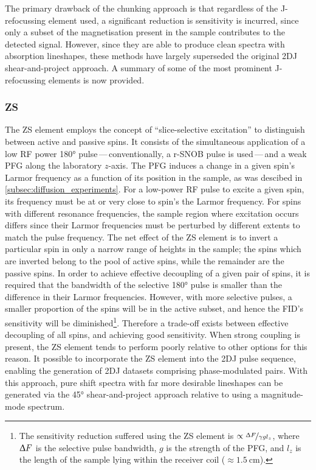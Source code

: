 The primary drawback of the chunking approach is that regardless of the
J-refocussing element used, a significant reduction is sensitivity is incurred,
since only a subset of the magnetisation present in the sample contributes to
the detected signal. However, since they are able to produce clean
spectra with absorption lineshapes, these methods have largely superseded the
original \ac{2DJ} shear-and-project approach. A summary of some of the most
prominent J-refocussing elements is now provided.

\subsubsection{\ac{ZS}}
\label{subsec:ZS}
The \ac{ZS} element employs the concept of ``slice-selective excitation'' to
distinguish between active and passive spins\cite{Zangger1997,Aguilar2010}. It
consists of the simultaneous application of a low \ac{RF} power \ang{180}
pulse\,---\,conventionally, a r-SNOB pulse is used\cite{Kupce1995}\,---\,and a
weak \ac{PFG} along the laboratory $z$-axis.
The \ac{PFG} induces a change in a given spin's Larmor frequency as a
function of its position in the sample, as was descibed in
\cref{subsec:diffusion_experiments}. For a low-power \ac{RF} pulse to excite
a given spin, its frequency must be at or very close to spin's the Larmor
frequency.
For spins with different resonance frequencies, the sample region where
excitation occurs differs since their Larmor frequencies must be perturbed by
different extents to match the pulse frequency.
The net effect of the \ac{ZS} element is to invert a particular spin in only a
narrow range of heights in the sample; the spins which are inverted belong to
the pool of active spins, while the remainder are the passive spins.
In order to achieve effective decoupling of a given pair of spins, it is required
that the bandwidth of the selective \ang{180} pulse is smaller than the
difference in their Larmor frequencies. However, with more selective pulses,
a smaller proportion of the spins will be in the active subset, and hence the
\ac{FID}'s sensitivity will be diminished\footnote{
    The sensitivity reduction suffered using the \ac{ZS} element is $\propto
    \nicefrac{\Updelta F}{\gamma g l_z}$, where $\Updelta F$ is the selective
    pulse bandwidth, $g$ is the strength of the \ac{PFG}, and $l_z$ is the
    length of the sample lying within the receiver coil ($\approx
    \qty{1.5}{\centi\meter}$).
}.
Therefore a trade-off exists between effective decoupling of all spins, and
achieving good sensitivity. When strong coupling is present,
the \ac{ZS} element tends to perform poorly relative to other options for this
reason. It possible to incorporate the \ac{ZS} element into the \ac{2DJ} pulse
sequence, enabling the generation of \ac{2DJ} datasets comprising
phase-modulated pairs\cite{Pell2007}. With this approach, pure
shift spectra with far more desirable lineshapes can be generated via the
\ang{45} shear-and-project approach relative to using a magnitude-mode
spectrum.

